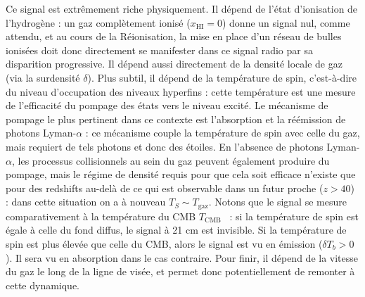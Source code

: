  Ce signal est extrêmement riche physiquement. Il dépend de l'état d'ionisation de l'hydrogène : un gaz complètement ionisé ($x_\mathrm{HI}=0$) donne un signal nul, comme attendu, et au cours de la Réionisation, la mise en place d'un réseau de bulles ionisées doit donc directement se manifester dans ce signal radio par sa disparition progressive. Il dépend aussi directement de la densité locale de gaz (via la surdensité $\delta$). Plus subtil, il dépend de la température de spin, c'est-à-dire du niveau d'occupation des niveaux hyperfins : cette température est une mesure de l'efficacité du pompage des états vers le niveau excité. Le mécanisme de pompage le plus pertinent dans ce contexte est l'absorption et la réémission de photons Lyman-$\alpha$ : ce mécanisme couple la température de spin avec celle du gaz, mais requiert de tels photons et donc des étoiles.  En l'absence de photons Lyman-$\alpha$, les processus collisionnels au sein du gaz peuvent également produire du pompage, mais le régime de densité requis pour que cela soit efficace n'existe que pour des redshifts au-delà de ce qui est observable dans un futur proche ($z>40$) : dans cette situation on a à nouveau $T_S\sim T_\mathrm{gaz}$. Notons que le signal se mesure comparativement à la température du CMB $T_\mathrm{CMB}$ ~: si la température de spin est égale à celle du fond diffus, le signal à 21 cm est invisible. Si la température de spin est plus élevée que celle du CMB, alors le signal est vu en émission ($\delta T_b >0$). Il sera vu en absorption dans le cas contraire. Pour finir, il dépend de la vitesse du gaz le long de la ligne de visée, et permet donc potentiellement de remonter à cette dynamique.

